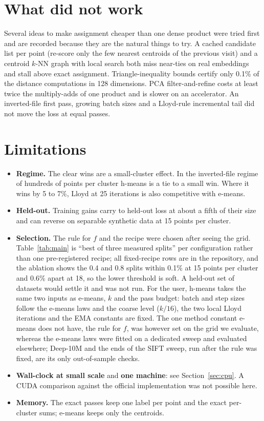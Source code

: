 \documentclass[11pt]{article}
\newcommand{\hm}{h-means}
\newcommand{\emeans}{e-means}
\begin{document}
\section{What did not work}

Several ideas to make assignment cheaper than one dense product were tried first and are recorded because they are the natural things to try. A cached candidate list per point (re-score only the few nearest centroids of the previous visit) and a centroid $k$-NN graph with local search both miss near-ties on real embeddings and stall above exact assignment. Triangle-inequality bounds certify only 0.1\% of the distance computations in 128 dimensions. PCA filter-and-refine costs at least twice the multiply-adds of one product and is slower on an accelerator. An inverted-file first pass, growing batch sizes and a Lloyd-rule incremental tail did not move the loss at equal passes.

\section{Limitations}

\begin{itemize}\setlength{\itemsep}{1pt}
\item \textbf{Regime.} The clear wins are a small-cluster effect. In the inverted-file regime of hundreds of points per cluster \hm{} is a tie to a small win. Where it wins by 5 to 7\%, Lloyd at 25 iterations is also competitive with \emeans.
\item \textbf{Held-out.} Training gains carry to held-out loss at about a fifth of their size and can reverse on separable synthetic data at 15 points per cluster.
\item \textbf{Selection.} The rule for $f$ and the recipe were chosen after seeing the grid. Table~\ref{tab:main} is ``best of three measured splits'' per configuration rather than one pre-registered recipe; all fixed-recipe rows are in the repository, and the ablation shows the 0.4 and 0.8 splits within 0.1\% at 15 points per cluster and 0.6\% apart at 18, so the lower threshold is soft. A held-out set of datasets would settle it and was not run. For the user, \hm{} takes the same two inputs as \emeans, $k$ and the pass budget: batch and step sizes follow the \emeans{} laws and the coarse level ($k/16$), the two local Lloyd iterations and the EMA constants are fixed. The one method constant \emeans{} does not have, the rule for $f$, was however set on the grid we evaluate, whereas the \emeans{} laws were fitted on a dedicated sweep and evaluated elsewhere; Deep-10M and the ends of the SIFT sweep, run after the rule was fixed, are its only out-of-sample checks.
\item \textbf{Wall-clock at small scale} and \textbf{one machine}: see Section~\ref{sec:cpu}. A CUDA comparison against the official implementation was not possible here.
\item \textbf{Memory.} The exact passes keep one label per point and the exact per-cluster sums; \emeans{} keeps only the centroids.
\end{itemize}
\end{document}
